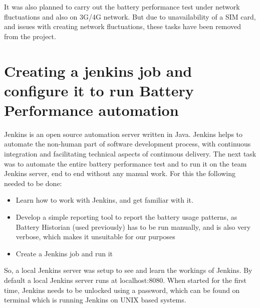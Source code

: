 It was also planned to carry out the battery performance test under network fluctuations and also on 3G/4G network. But due to unavailability of a SIM card, and issues with creating network fluctuations, these tasks have been removed from the project.\\

\section{Creating a jenkins job and configure it to run Battery Performance automation}Jenkins is an open source automation server written in Java. Jenkins helps to automate the non-human part of software development process, with continuous integration and facilitating technical aspects of continuous delivery. The next task was to automate the entire battery performance test and to run it on the team Jenkins server, end to end without any manual work. For this the following needed to be done:
\begin{itemize}
	\item Learn how to work with Jenkins, and get familiar with it.
	\item Develop a simple reporting tool to report the battery usage patterns, as Battery Historian (used previously) has to be run manually, and is also very verbose, which makes it unsuitable for our purposes
	\item Create a Jenkins job and run it
\end{itemize}

So, a local Jenkins server was setup to see and learn the workings of Jenkins. By default a local Jenkins server runs at localhost:8080. When started for the first time, Jenkins needs to be unlocked using a password, which can be found on terminal which is running Jenkins on UNIX based systems.\\

